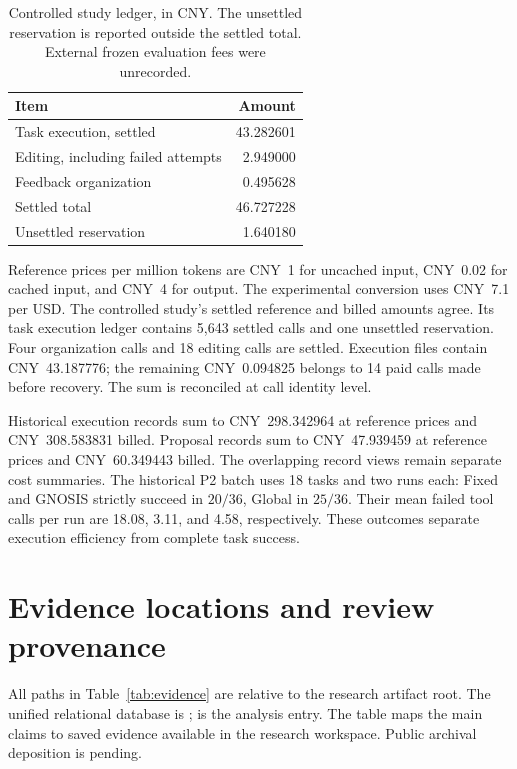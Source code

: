 \begin{table}[t]
\centering
\caption{Controlled study ledger, in CNY. The unsettled reservation is reported outside the settled total. External frozen evaluation fees were unrecorded.}
\label{tab:ledger}
\small
\renewcommand{\arraystretch}{1.13}
\begin{tabular*}{\columnwidth}{@{\extracolsep{\fill}}lr@{}}
\toprule
Item & Amount\\
\midrule
Task execution, settled & 43.282601\\
Editing, including failed attempts & 2.949000\\
Feedback organization & 0.495628\\
\midrule
Settled total & 46.727228\\
\addlinespace
Unsettled reservation & 1.640180\\
\bottomrule
\end{tabular*}
\end{table}

Reference prices per million tokens are CNY~1 for uncached input, CNY~0.02 for cached input, and CNY~4 for output. The experimental conversion uses CNY~7.1 per USD. The controlled study's settled reference and billed amounts agree. Its task execution ledger contains 5,643 settled calls and one unsettled reservation. Four organization calls and 18 editing calls are settled. Execution files contain CNY~43.187776; the remaining CNY~0.094825 belongs to 14 paid calls made before recovery. The sum is reconciled at call identity level.

Historical execution records sum to CNY~298.342964 at reference prices and CNY~308.583831 billed. Proposal records sum to CNY~47.939459 at reference prices and CNY~60.349443 billed. The overlapping record views remain separate cost summaries. The historical P2 batch uses 18 tasks and two runs each: Fixed and GNOSIS strictly succeed in $20/36$, Global in $25/36$. Their mean failed tool calls per run are 18.08, 3.11, and 4.58, respectively. These outcomes separate execution efficiency from complete task success.

\section{Evidence locations and review provenance}

All paths in Table~\ref{tab:evidence} are relative to the research artifact root. The unified relational database is ;  is the analysis entry. The table maps the main claims to saved evidence available in the research workspace. Public archival deposition is pending.

